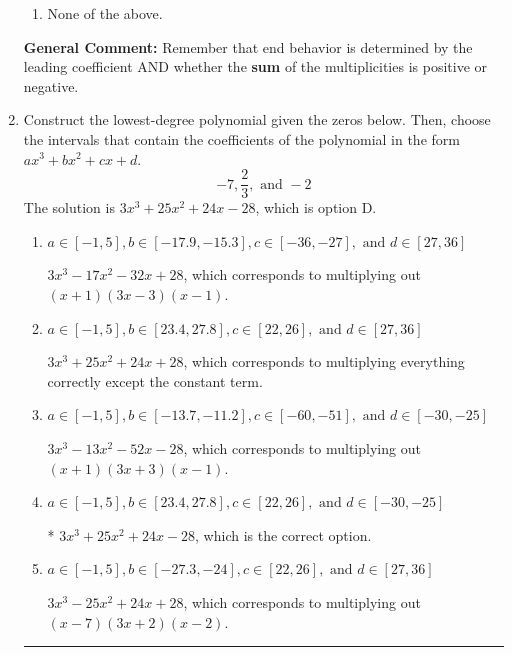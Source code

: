 \documentclass{extbook}[14pt]
\newcommand{\litem}[1]{\item #1

\rule{\textwidth}{0.4pt}}
\begin{document}
\begin{enumerate}
{\begin{enumerate}[label=\Alph*.]
\item None of the above.\end{enumerate}
\textbf{General Comment:} Remember that end behavior is determined by the leading coefficient AND whether the \textbf{sum} of the multiplicities is positive or negative.
}
\litem{
Construct the lowest-degree polynomial given the zeros below. Then, choose the intervals that contain the coefficients of the polynomial in the form $ax^3+bx^2+cx+d$.
\[ -7, \frac{2}{3}, \text{ and } -2 \]
The solution is \( 3x^{3} +25 x^{2} +24 x -28 \), which is option D.\begin{enumerate}[label=\Alph*.]
\item \( a \in [-1, 5], b \in [-17.9, -15.3], c \in [-36, -27], \text{ and } d \in [27, 36] \)

$3x^{3} -17 x^{2} -32 x + 28$, which corresponds to multiplying out $(x + 1)(3x -3)(x -1)$.
\item \( a \in [-1, 5], b \in [23.4, 27.8], c \in [22, 26], \text{ and } d \in [27, 36] \)

$3x^{3} +25 x^{2} +24 x + 28$, which corresponds to multiplying everything correctly except the constant term.
\item \( a \in [-1, 5], b \in [-13.7, -11.2], c \in [-60, -51], \text{ and } d \in [-30, -25] \)

$3x^{3} -13 x^{2} -52 x -28$, which corresponds to multiplying out $(x + 1)(3x + 3)(x -1)$.
\item \( a \in [-1, 5], b \in [23.4, 27.8], c \in [22, 26], \text{ and } d \in [-30, -25] \)

* $3x^{3} +25 x^{2} +24 x -28$, which is the correct option.
\item \( a \in [-1, 5], b \in [-27.3, -24], c \in [22, 26], \text{ and } d \in [27, 36] \)

$3x^{3} -25 x^{2} +24 x + 28$, which corresponds to multiplying out $(x -7)(3x + 2)(x -2)$.
\end{enumerate}

}
\end{enumerate}
\end{document}

